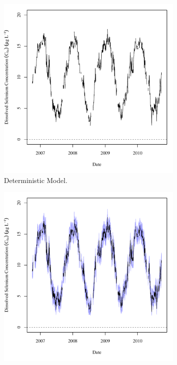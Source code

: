 \begin{linenumbers}
\begin{figure}[htbp]
\centering
	\begin{subfigure}{0.5\textwidth}
		\includegraphics[width=0.9\linewidth]{"Figures/Results_DUSR/c TS U163"}
		\caption{Deterministic Model.}
		\label{sub:ExDCSeTS}
	\end{subfigure}%
	\begin{subfigure}{0.5\textwidth}
		\includegraphics[width=0.9\linewidth]{"Figures/Results_USR/c TS U163"}

\end{subfigure}
\end{figure}
\end{linenumbers}
